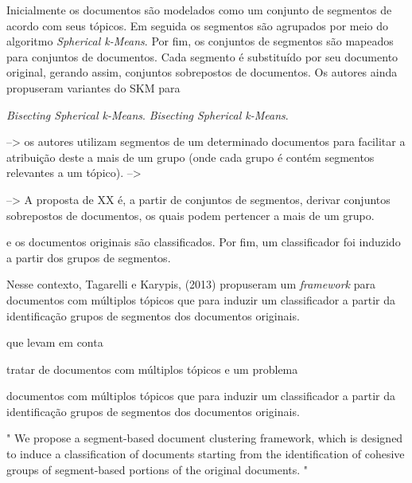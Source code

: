 Inicialmente os documentos são modelados como um conjunto de segmentos de acordo com seus tópicos. Em seguida os segmentos são agrupados por meio do algoritmo \textit{Spherical k-Means}\cite{I. S. Dhillon and D. S. Modha,   Y. Zhao and G. Karypis}. Por fim, os conjuntos de segmentos são mapeados para conjuntos de documentos. Cada segmento é substituído por seu documento original, gerando assim, conjuntos sobrepostos de documentos. Os autores ainda propuseram variantes do SKM para 


\textit{Bisecting Spherical k-Means}\cite{Y. Zhao and G. Karypis}.
\textit{Bisecting Spherical k-Means}\cite{I. S. Dhillon and D. S. Modha,   Y. Zhao and G. Karypis}.

--> os autores utilizam segmentos de um determinado documentos para facilitar a atribuição deste a mais de um grupo (onde cada grupo é contém segmentos relevantes a um tópico).
--> 

--> A proposta de XX é, a partir de conjuntos de segmentos, derivar conjuntos sobrepostos de documentos, os quais podem pertencer a mais de um grupo.




e os documentos originais são classificados. Por fim, um classificador foi induzido a partir dos grupos de segmentos.



Nesse contexto, Tagarelli e Karypis, (2013) propuseram um \textit{framework} para documentos com múltiplos tópicos que para induzir um classificador a partir da identificação grupos de segmentos dos documentos originais.


que levam em conta 




tratar de documentos com múltiplos tópicos e um problema 

documentos com múltiplos tópicos que para induzir um classificador a partir da identificação grupos de segmentos dos documentos originais.



\cite{Tagarelli2013} 
" We propose a segment-based document clustering framework, which is designed to induce a classification of documents starting from the identification of cohesive groups of segment-based portions of the original documents. "


